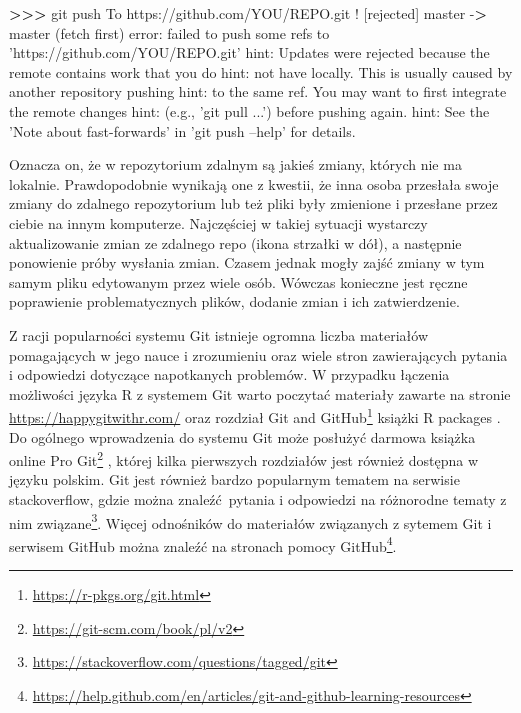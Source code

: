 \documentclass[paper=6in:9in,pagesize=pdftex,headinclude=on,footinclude=on,10pt]{scrbook}
\newenvironment{Shaded}{\begin{snugshade}}{\end{snugshade}}
\newcommand{\ExtensionTok}[1]{#1}
\newcommand{\FunctionTok}[1]{\textcolor[rgb]{0.00,0.00,0.00}{#1}}
\newcommand{\NormalTok}[1]{#1}
\newcommand{\OperatorTok}[1]{\textcolor[rgb]{0.81,0.36,0.00}{\textbf{#1}}}
\newcommand{\StringTok}[1]{\textcolor[rgb]{0.31,0.60,0.02}{#1}}
\DeclareRobustCommand{\href}[2]{#2\footnote{\url{#1}}}
\begin{document}
\begin{Shaded}
\begin{Highlighting}[]
\OperatorTok{>>>} \FunctionTok{git}\NormalTok{ push}
\ExtensionTok{To}\NormalTok{ https://github.com/YOU/REPO.git}
\NormalTok{ ! [}\ExtensionTok{rejected}\NormalTok{]        master -}\OperatorTok{>}\NormalTok{ master (fetch first)}
\ExtensionTok{error}\NormalTok{: failed to push some refs to }\StringTok{'https://github.com/YOU/REPO.git'}
\ExtensionTok{hint}\NormalTok{: Updates were rejected because the remote contains work that you do}
\ExtensionTok{hint}\NormalTok{: not have locally. This is usually caused by another repository pushing}
\ExtensionTok{hint}\NormalTok{: to the same ref. You may want to first integrate the remote changes}
\ExtensionTok{hint}\NormalTok{: (e.g., }\StringTok{'git pull ...'}\NormalTok{) }\ExtensionTok{before}\NormalTok{ pushing again.}
\ExtensionTok{hint}\NormalTok{: See the }\StringTok{'Note about fast-forwards'}\NormalTok{ in }\StringTok{'git push --help'}\NormalTok{ for details.}
\end{Highlighting}
\end{Shaded}

Oznacza on, że w repozytorium zdalnym są jakieś zmiany, których nie ma lokalnie.
Prawdopodobnie wynikają one z kwestii, że inna osoba przesłała swoje zmiany do zdalnego repozytorium lub też pliki były zmienione i przesłane przez ciebie na innym komputerze.
Najczęściej w takiej sytuacji wystarczy aktualizowanie zmian ze zdalnego repo (ikona strzałki w dół), a następnie ponowienie próby wysłania zmian.
Czasem jednak mogły zajść zmiany w tym samym pliku edytowanym przez wiele osób.
Wówczas konieczne jest ręczne poprawienie problematycznych plików, dodanie zmian i ich zatwierdzenie.

Z racji popularności systemu Git istnieje ogromna liczba materiałów pomagających w jego nauce i zrozumieniu oraz wiele stron zawierających pytania i odpowiedzi dotyczące napotkanych problemów.
W przypadku łączenia możliwości języka R z systemem Git warto poczytać materiały zawarte na stronie \url{https://happygitwithr.com/} \citep{bryanHappyGitGitHub2019} oraz rozdział \href{https://r-pkgs.org/git.html}{Git and GitHub} książki R packages \citep{wickham2015r}.
Do ogólnego wprowadzenia do systemu Git może posłużyć darmowa książka online \href{https://git-scm.com/book/pl/v2}{Pro Git} \citep{chacon2014pro}, której kilka pierwszych rozdziałów jest również dostępna w języku polskim.
Git jest również bardzo popularnym tematem na serwisie stackoverflow, gdzie można znaleźć~\href{https://stackoverflow.com/questions/tagged/git}{pytania i odpowiedzi na różnorodne tematy z nim związane}.
Więcej odnośników do materiałów związanych z sytemem Git i serwisem GitHub można znaleźć na stronach \href{https://help.github.com/en/articles/git-and-github-learning-resources}{pomocy GitHub}.
\end{document}
